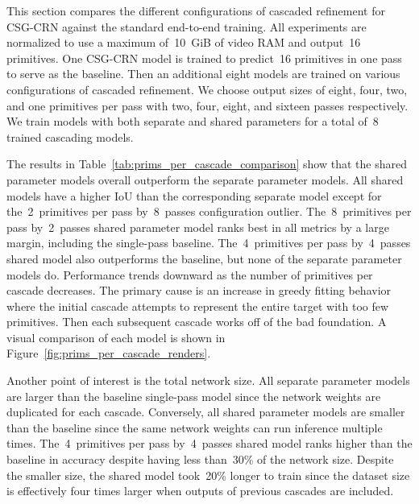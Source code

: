 This section compares the different configurations of cascaded refinement for CSG-CRN against the standard end-to-end training. All experiments are normalized to use a maximum of~10~GiB of video RAM and output~16 primitives. One CSG-CRN model is trained to predict~16 primitives in one pass to serve as the baseline. Then an additional eight models are trained on various configurations of cascaded refinement. We choose output sizes of eight, four, two, and one primitives per pass with two, four, eight, and sixteen passes respectively. We train models with both separate and shared parameters for a total of~8 trained cascading models.

The results in Table~\ref{tab:prims_per_cascade_comparison} show that the shared parameter models overall outperform the separate parameter models. All shared models have a higher IoU than the corresponding separate model except for the~2~primitives per pass by~8~passes configuration outlier. The~8~primitives per pass by~2~passes shared parameter model ranks best in all metrics by a large margin, including the single-pass baseline. The~4~primitives per pass by~4~passes shared model also outperforms the baseline, but none of the separate parameter models do. Performance trends downward as the number of primitives per cascade decreases. The primary cause is an increase in greedy fitting behavior where the initial cascade attempts to represent the entire target with too few primitives. Then each subsequent cascade works off of the bad foundation. A visual comparison of each model is shown in Figure~\ref{fig:prims_per_cascade_renders}.

Another point of interest is the total network size. All separate parameter models are larger than the baseline single-pass model since the network weights are duplicated for each cascade. Conversely, all shared parameter models are smaller than the baseline since the same network weights can run inference multiple times. The~4~primitives per pass by~4~passes shared model ranks higher than the baseline in accuracy despite having less than~30\% of the network size. Despite the smaller size, the shared model took~20\% longer to train since the dataset size is effectively four times larger when outputs of previous cascades are included.


